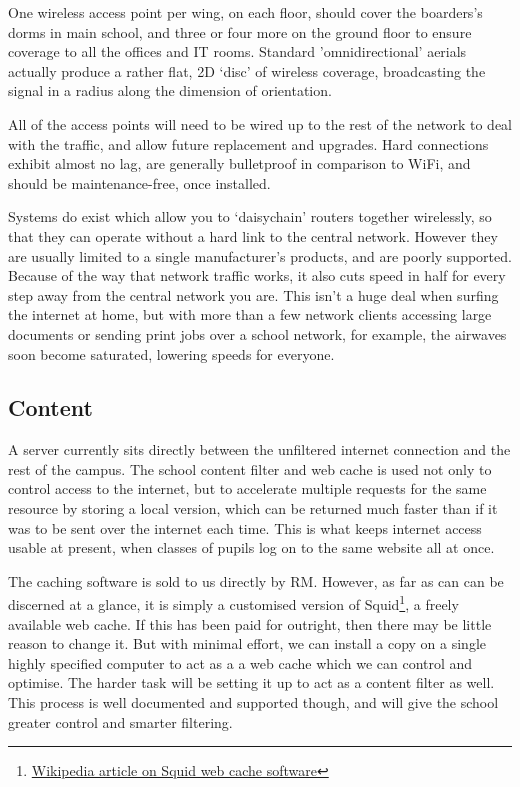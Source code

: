 \documentclass[a4paper,leqno,titlepage]{article}
\begin{document}
One wireless access point per wing, on each floor, should cover the boarders's
dorms in main school, and three or four more on the ground floor to ensure
coverage to all the offices and IT rooms. Standard 'omnidirectional' aerials
actually produce a rather flat, 2D `disc' of wireless coverage, broadcasting
the signal in a radius along the dimension of orientation.


All of the access points will need to be wired up to the rest of the network
to deal with the traffic, and allow future replacement and upgrades.
Hard connections exhibit almost no lag, are generally bulletproof in
comparison to WiFi, and should be maintenance-free, once installed.


Systems do exist which allow you to `daisychain' routers together wirelessly,
so that they can operate without a hard link to the central network. However
they are usually limited to a single manufacturer's products,
and are poorly supported. Because of the way that network traffic works,
it also cuts speed in half for every step away from the central network you are.
This isn't a huge deal when surfing the internet at home,
but with more than a few network clients accessing large documents or sending
print jobs over a school network, for example,
the airwaves soon become saturated, lowering speeds for everyone.


\subsection{Content}

A server currently sits directly between the unfiltered internet connection and
the rest of the campus. The school content filter and web cache is used not only
to control access to the internet, but to accelerate multiple requests for the
same resource by storing a local version, which can be returned much faster than
if it was to be sent over the internet each time. This is what keeps internet
access usable at present, when classes of pupils log on to the same website
all at once.


The caching software is sold to us directly by RM. However, as far as can can
be discerned at a glance, it is simply a customised version of
Squid\footnote{\href{http://en.wikipedia.org/wiki/Squid_(software)}{Wikipedia article on Squid web cache software}},
a freely available web cache. If this has been paid for outright, then there
may be little reason to change it. But with minimal effort, we can install a
copy on a single highly specified computer to act as a a web cache which we
can control and optimise. The harder task will be setting it up to act as a
content filter as well. This process is well documented and supported though,
and will give the school greater control and smarter filtering.
\end{document}
